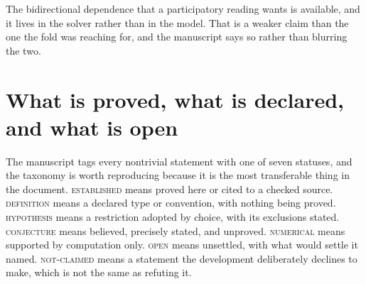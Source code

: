 \documentclass[11pt,letterpaper]{article}
\begin{document}
\begin{translationbox}
The bidirectional dependence that a participatory reading wants is available, and it lives in the solver rather than in the model. That is a weaker claim than the one the fold was reaching for, and the manuscript says so rather than blurring the two.
\end{translationbox}

\section{What is proved, what is declared, and what is open}

The manuscript tags every nontrivial statement with one of seven statuses, and the taxonomy is worth reproducing because it is the most transferable thing in the document. \textsc{established} means proved here or cited to a checked source. \textsc{definition} means a declared type or convention, with nothing being proved. \textsc{hypothesis} means a restriction adopted by choice, with its exclusions stated. \textsc{conjecture} means believed, precisely stated, and unproved. \textsc{numerical} means supported by computation only. \textsc{open} means unsettled, with what would settle it named. \textsc{not-claimed} means a statement the development deliberately declines to make, which is not the same as refuting it.
\end{document}
